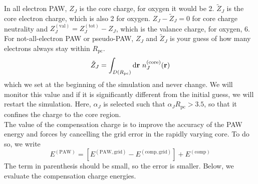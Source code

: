 \documentclass[paper=a4, fontsize=11pt]{article} %
\numberwithin{equation}{section} %
\numberwithin{figure}{section} %
\numberwithin{table}{section} %
\newcommand{\br}{{\bf{r}}}
\newcommand{\rcore}{{\mathrm{core}}}
\newcommand{\rP}{{\mathrm{PAW}}}
\newcommand{\rd}{{\mathrm{d}}}
\newcommand{\rcomp}{{\mathrm{comp}}}
\newcommand{\rtot}{{\mathrm{tot}}}
\newcommand{\al}{{\alpha}}
\newcommand{\Rpc}{{R_{\mathrm{pc}}}}
\begin{document}
In all electron PAW, $Z_J$ is the core charge, for oxygen it would be 2. $\tilde Z_J$ is the core electron charge, which is also 2 for oxygen. $Z_J - \tilde Z_J = 0$ for core charge neutrality and $Z_J^{(\mathrm{val})} = Z_J^{(\rtot)} - Z_J$, which is the valance charge, for oxygen, 6. For not-all-electron PAW or pseudo-PAW, $Z_J$ and $\tilde Z_J$ is your guess of how many electrons always stay within $\Rpc$. 
\begin{equation}
\tilde Z_J = \int_{D(\Rpc)} \rd \br \ n^{(\rcore)}_J(\br)
\end{equation}
which we set at the beginning of the simulation and never change. We will monitor this value and if it is significantly different from the initial guess, we will restart the simulation. Here, $\al_J$ is selected such that $\al_J \Rpc > 3.5$, so that it confines the charge to the core region. \\

The value of the compensation charge is to improve the accuracy of the PAW energy and forces by cancelling the grid error in the rapidly varying core. To do so, we write
\begin{equation}
E^{(\rP)} = \left[ E^{(\rP,\mathrm{grid})}-E^{(\rcomp,\mathrm{grid})}\right] + E^{(\rcomp)}
\end{equation}
The term in parenthesis should be small, so the error is smaller. Below, we evaluate the compensation charge energies.\\
\end{document}
